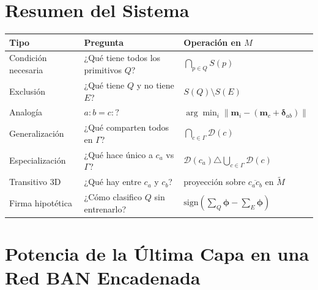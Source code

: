 \documentclass[12pt]{article}
\begin{document}
\section{Resumen del Sistema}

\begin{center}
	\begin{tabular}{p{3.2cm} p{4.5cm} p{4.5cm}}
		\toprule
		\textbf{Tipo} & \textbf{Pregunta} & \textbf{Operación en $M$} \\
		\midrule
		Condición necesaria
		& ¿Qué tiene todos los primitivos $Q$?
		& $\bigcap_{p \in Q} S(p)$ \\[6pt]
		Exclusión
		& ¿Qué tiene $Q$ y no tiene $E$?
		& $S(Q) \setminus S(E)$ \\[6pt]
		Analogía
		& $a:b = c:?$
		& $\arg\min_i \|\mathbf{m}_i - (\mathbf{m}_c + \bm{\delta}_{ab})\|$ \\[6pt]
		Generalización
		& ¿Qué comparten todos en $\Gamma$?
		& $\bigcap_{c \in \Gamma} \mathcal{D}(c)$ \\[6pt]
		Especialización
		& ¿Qué hace único a $c_a$ vs $\Gamma$?
		& $\mathcal{D}(c_a) \triangle \bigcup_{c \in \Gamma}\mathcal{D}(c)$ \\[6pt]
		Transitivo 3D
		& ¿Qué hay entre $c_a$ y $c_b$?
		& proyección sobre $\overline{c_a c_b}$ en $\tilde{M}$ \\[6pt]
		Firma hipotética
		& ¿Cómo clasifico $Q$ sin entrenarlo?
		& $\mathrm{sign}(\sum_{Q}\bm{\phi} - \sum_{E}\bm{\phi})$ \\
		\bottomrule
	\end{tabular}
\end{center}

































\section*{Potencia de la Última Capa en una Red BAN Encadenada}
\end{document}
